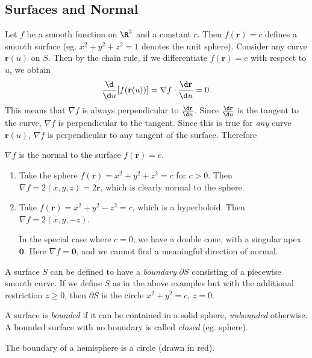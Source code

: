 \documentclass[a4paper]{article}
\begin{document}
\subsection{Surfaces and Normal}
Let $f$ be a smooth function on $\R^3$ and a constant $c$. Then $f(\mathbf{r}) = c$ defines a smooth surface (eg. $x^2 + y^2 + z^2 = 1$ denotes the unit sphere). Consider any curve $\mathbf{r}(u)$ on $S$. Then by the chain rule, if we differentiate $f(\mathbf{r}) = c$ with respect to $u$, we obtain
\[
  \frac{\d }{\d u}[f(\mathbf{r}(u))] = \nabla f\cdot \frac{\d \mathbf{r}}{\d u} = 0.
\]
This means that $\nabla f$ is always perpendicular to $\frac{\d \mathbf{r}}{\d u}$. Since $\frac{\d \mathbf{r}}{\d u}$ is the tangent to the curve, $\nabla f$ is perpendicular to the tangent. Since this is true for \emph{any} curve $\mathbf{r}(u)$, $\nabla f$ is perpendicular to any tangent of the surface. Therefore
\begin{prop}
  $\nabla f$ is the normal to the surface $f(\mathbf{r}) = c$.
\end{prop}

\begin{eg}\leavevmode
  \begin{enumerate}
    \item Take the sphere $f(\mathbf{r}) = x^2 + y^2 + z^2 = c$ for $c > 0$. Then $\nabla f = 2(x, y, z) = 2\mathbf{r}$, which is clearly normal to the sphere.
    \item Take $f(\mathbf{r}) = x^2 + y^2 - z^2 = c$, which is a hyperboloid. Then $\nabla f = 2(x, y, -z)$.

      In the special case where $c = 0$, we have a double cone, with a singular apex $\mathbf{0}$. Here $\nabla f = \mathbf{0}$, and we cannot find a meaningful direction of normal.
  \end{enumerate}
\end{eg}

\begin{defi}[Boundary]
  A surface $S$ can be defined to have a \emph{boundary} $\partial S$ consisting of a piecewise smooth curve. If we define $S$ as in the above examples but with the additional restriction $z \geq 0$, then $\partial S$ is the circle $x^2 + y^2 = c$, $z = 0$.

  A surface is \emph{bounded} if it can be contained in a solid sphere, \emph{unbounded} otherwise. A bounded surface with no boundary is called \emph{closed} (eg. sphere).
\end{defi}
\begin{eg}\leavevmode
  \begin{center}
  \end{center}
  The boundary of a hemisphere is a circle (drawn in red).
\end{eg}
\end{document}
